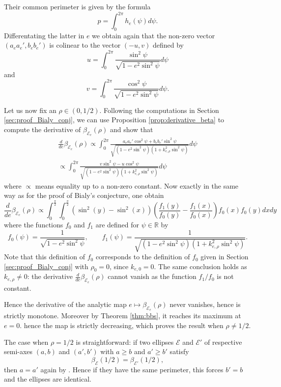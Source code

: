 \documentclass[a4paper]{article}
\theoremstyle{definition}
\def\R{\mathbb{R}}
\begin{document}
Their common perimeter is given by the formula
\[
p = \int_0^{2\pi} h_e(\psi)d\psi.
\]
Differentating the latter in $e$ we obtain again that the non-zero vector $(a_{e}a_{e}',b_{e}b_{e}')$ is colinear to the vector $(-u,v)$ defined by
\[
u = \int_0^{2\pi}\frac{\sin^2\psi}{\sqrt{1-e^2\sin^2\psi}}d\psi
\]
and
\[
v = \int_0^{2\pi}\frac{\cos^2\psi}{\sqrt{1-e^2\sin^2\psi}}d\psi.
\]

Let us now fix an $\rho\in(0,1/2)$. Following the computations in Section \ref{sec:proof_Bialy_conj}, we can use Proposition \ref{prop:derivative_beta} to compute the derivative of $\beta_{\mathscr E_e}(\rho)$ and show that
\begin{multline}
\frac{d}{de}\beta_{\mathscr E_e}(\rho)
\propto
\int_0^{2\pi}\frac{a_{e}a_{e}'\cos^2\psi+b_{e}b_{e}'\sin^2\psi}{\sqrt{(1-e^2\sin^2\psi)(1+k_{e,\rho}^2\sin^2\psi)}}d\psi\\
\propto \int_0^{2\pi}\frac{v\sin^2\psi-u\cos^2\psi}{\sqrt{(1-e^2\sin^2\psi)(1+k_{e,\rho}^2\sin^2\psi)}}d\psi
\end{multline}
where $\propto$ means equality up to a non-zero constant. Now exactly in the same way as for the proof of Bialy's conjecture, one obtain
\[
\frac{d}{de}\beta_{\mathscr E_e}(\rho) 
\propto
\int_0^{\frac{\pi}{2}}\int_0^{\frac{\pi}{2}}(\sin^2(y)-\sin^2(x))\left(\frac{f_1(y)}{f_0(y)}-\frac{f_1(x)}{f_0(x)}\right)f_0(x)f_0(y)dxdy
\]
where the functions $f_0$ and $f_1$
are defined for $\psi\in\R$ by
 \[
 f_0(\psi) = \frac{1}{\sqrt{1-e^2\sin^2\psi}},\qquad
 f_1(\psi) = \frac{1}{\sqrt{(1-e^2\sin^2\psi)(1+k_{e,\rho}^2\sin^2\psi)}}.
 \]
 Note that this definition of $f_0$ corresponds to the definition of $f_0$ given in Section \ref{sec:proof_Bialy_conj} with $\rho_0=0$, since $k_{e,0}=0$. The same conclusion holds as $k_{e,\rho}\neq 0$: the derivative $\frac{d}{de}\beta_{\mathscr E_e}(\rho)$ cannot vanish as the function $f_1/f_0$ is not constant.

Hence the derivative of the analytic map $e\mapsto \beta_{\mathscr E_e}(\rho)$ never vanishes, hence is strictly monotone. Moreover by Theorem \ref{thm:bbs}, it reaches its maximum at $e=0$. hence the map is strictly decreasing, which proves the result when $\rho\neq 1/2$.
\vspace{0.2cm}

The case when $\rho=1/2$ is straightforward: if two ellipses $\mathscr E$ and $\mathscr E'$ of respective semi-axes $(a,b)$ and $(a',b')$ with $a\geq b$ and $a'\geq b'$ satisfy
\[
\beta_{\mathscr E}(1/2)=\beta_{\mathscr E'}(1/2),
\]
then $a=a'$ again by \cite[Example 2 following Corollary 2.2]{Bialyellipses}. Hence if they have the same perimeter, this forces $b'=b$ and the ellipses are identical.
\end{document}
